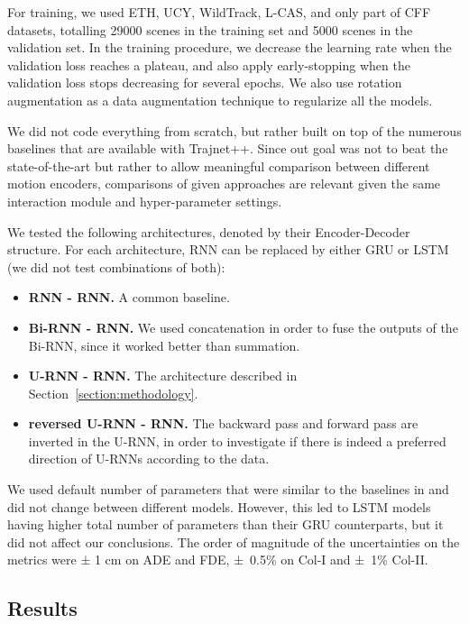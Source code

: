 \documentclass[conference]{IEEEtran}
\begin{document}
For training, we used ETH, UCY, WildTrack, L-CAS, and only part of CFF datasets, totalling 29000 scenes in the training set and 5000 scenes in the validation set. In the training procedure, we decrease the learning rate when the validation loss reaches a plateau, and also apply early-stopping when the validation loss stops decreasing for several epochs. We also use rotation augmentation as a data augmentation technique to regularize all the models.

We did not code everything from scratch, but rather built on top of the numerous baselines that are available with Trajnet++. Since out goal was not to beat the state-of-the-art but rather to allow meaningful comparison between different motion encoders, comparisons of given approaches are relevant given the same interaction module and hyper-parameter settings.

We tested the following architectures, denoted by their Encoder-Decoder structure.
For each architecture, RNN can be replaced by either GRU \cite{cho2014properties,chung2014empirical} or LSTM \cite{hochreiter1997long} (we did not test combinations of both):
\begin{itemize}
    \item \textbf{RNN - RNN.} A common baseline.
    \item \textbf{Bi-RNN - RNN.} We used concatenation in order to fuse the outputs of the Bi-RNN, since it worked better than summation.
    \item \textbf{U-RNN - RNN.} The architecture described in Section~\ref{section:methodology}.
    \item \textbf{reversed U-RNN - RNN.} The backward pass and forward pass are inverted in the U-RNN, in order to investigate if there is indeed a preferred direction of U-RNNs according to the data.
\end{itemize}

We used default number of parameters that were similar to the baselines in \cite{kothari_human_2021} and did not change between different models. However, this led to LSTM models having higher total number of parameters than their GRU counterparts, but it did not affect our conclusions. The order of magnitude of the uncertainties on the metrics were ± 1 cm on ADE and FDE, ±~0.5\% on Col-I and ±~1\% Col-II.

\subsection{Results}
\end{document}
